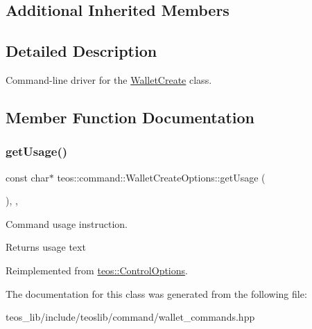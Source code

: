 \subsection*{Additional Inherited Members}


\subsection{Detailed Description}
Command-\/line driver for the \mbox{\hyperlink{classteos_1_1command_1_1_wallet_create}{Wallet\+Create}} class. 

\subsection{Member Function Documentation}
\mbox{\label{classteos_1_1command_1_1_wallet_create_options_ad20c1955cb48f6c9e640c35eae091c30}} 
\subsubsection{\texorpdfstring{get\+Usage()}{getUsage()}}
{\footnotesize\ttfamily const char$\ast$ teos\+::command\+::\+Wallet\+Create\+Options\+::get\+Usage (\begin{DoxyParamCaption}{ }\end{DoxyParamCaption})\hspace{0.3cm}{\ttfamily [inline]}, {\ttfamily [protected]}, {\ttfamily [virtual]}}



Command \textquotesingle{}usage\textquotesingle{} instruction. 

\begin{DoxyReturn}{Returns}
usage text 
\end{DoxyReturn}


Reimplemented from \mbox{\hyperlink{classteos_1_1_control_options_a0aa5671f9bc750ed5280c26c543874f3}{teos\+::\+Control\+Options}}.



The documentation for this class was generated from the following file\+:\begin{DoxyCompactItemize}
\item 
teos\+\_\+lib/include/teoslib/command/wallet\+\_\+commands.\+hpp\end{DoxyCompactItemize}

